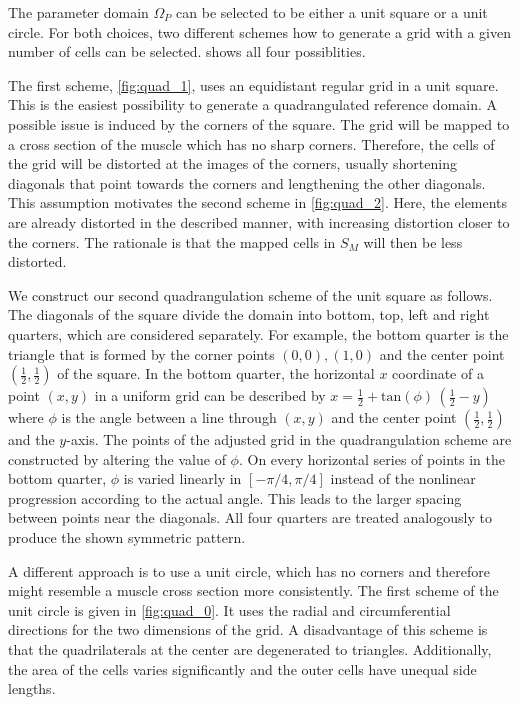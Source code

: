 The parameter domain $\Omega_P$ can be selected to be either a unit square or a unit circle. For both choices, two different schemes how to generate a grid with a given number of cells can be selected.
 shows all four possiblities.

The first scheme, \cref{fig:quad_1}, uses an equidistant regular grid in a unit square. This is the easiest possibility to generate a quadrangulated reference domain. A possible issue is induced by the corners of the square. The grid will be mapped to a cross section of the muscle which has no sharp corners. Therefore, the cells of the grid will be distorted at the images of the corners, usually shortening diagonals that point towards the corners and lengthening the other diagonals. This assumption motivates the second scheme in \cref{fig:quad_2}. Here, the elements are already distorted in the described manner, with increasing distortion closer to the corners. The rationale is that the mapped cells in $S_M$ will then be less distorted.

We construct our second quadrangulation scheme of the unit square as follows. The diagonals of the square divide the domain into bottom, top, left and right quarters, which are considered separately.
For example, the bottom quarter is the triangle that is formed by the corner points $(0,0), (1,0)$ and the center point $(\frac12,\frac12)$ of the square. In the bottom quarter, the horizontal $x$ coordinate of a point $(x,y)$ in a uniform grid can be described by $x = \frac12 + \textrm{tan}(\phi)\,(\frac12-y)$ where $\phi$ is the angle between a line through $(x,y)$ and the center point $(\frac12,\frac12)$ and the $y$-axis. The points of the adjusted grid in the quadrangulation scheme are constructed by altering the value of $\phi$.
On every horizontal series of points in the bottom quarter, $\phi$ is varied linearly in $[-\pi/4,\pi/4]$ instead of the nonlinear progression according to the actual angle. This leads to the larger spacing between points near the diagonals. All four quarters are treated analogously to produce the shown symmetric pattern.

A different approach is to use a unit circle, which has no corners and therefore might resemble a muscle cross section more consistently. The first scheme of the unit circle is given in \cref{fig:quad_0}. It uses the radial and circumferential directions for the two dimensions of the grid. A disadvantage of this scheme is that the quadrilaterals at the center are degenerated to triangles. Additionally, the area of the cells varies significantly and the outer cells have unequal side lengths. 

